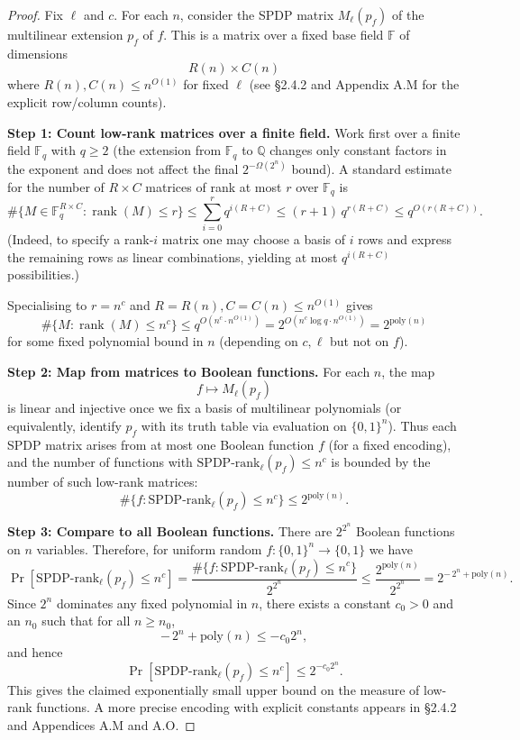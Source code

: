 \documentclass[12pt]{article}
\DeclareMathOperator{\rank}{rank}
\theoremstyle{definition}
\theoremstyle{definition}
\theoremstyle{remark}
\theoremstyle{remark}
\begin{document}
\begin{proof}
Fix $\ell$ and $c$. For each $n$, consider the SPDP matrix $M_\ell(p_f)$ of the multilinear
extension $p_f$ of $f$. This is a matrix over a fixed base field $\mathbb{F}$ of
dimensions
\[
  R(n) \times C(n)
\]
where $R(n), C(n) \le n^{O(1)}$ for fixed $\ell$ (see \S2.4.2 and Appendix A.M for the explicit
row/column counts).

\medskip\noindent
\textbf{Step 1: Count low-rank matrices over a finite field.}
Work first over a finite field $\mathbb{F}_q$ with $q \ge 2$ (the extension from $\mathbb{F}_q$
to $\mathbb{Q}$ changes only constant factors in the exponent and does not affect the final
$2^{-\Omega(2^n)}$ bound). A standard estimate for the number of $R \times C$ matrices of
rank at most $r$ over $\mathbb{F}_q$ is
\[
  \#\{M \in \mathbb{F}_q^{R \times C} : \rank(M) \le r\}
  \le
  \sum_{i=0}^{r} q^{i(R+C)}
  \le (r+1)\, q^{r(R+C)}
  \le q^{O(r(R+C))}.
\]
(Indeed, to specify a rank-$i$ matrix one may choose a basis of $i$ rows and express the
remaining rows as linear combinations, yielding at most $q^{i(R+C)}$ possibilities.)

Specialising to $r = n^c$ and $R = R(n), C = C(n) \le n^{O(1)}$ gives
\[
  \#\{M : \rank(M) \le n^c\}
  \le
  q^{O(n^c \cdot n^{O(1)})}
  =
  2^{O(n^c \log q \cdot n^{O(1)})}
  =
  2^{\mathrm{poly}(n)}
\]
for some fixed polynomial bound in $n$ (depending on $c,\ell$ but not on $f$).

\medskip\noindent
\textbf{Step 2: Map from matrices to Boolean functions.}
For each $n$, the map
\[
  f \longmapsto M_\ell(p_f)
\]
is linear and injective once we fix a basis of multilinear polynomials (or equivalently,
identify $p_f$ with its truth table via evaluation on $\{0,1\}^n$). Thus each SPDP matrix
arises from at most one Boolean function $f$ (for a fixed encoding), and the number of
functions with $\mathrm{SPDP\text{-}rank}_\ell(p_f) \le n^c$ is bounded by the number of such
low-rank matrices:
\[
  \#\{ f : \mathrm{SPDP\text{-}rank}_\ell(p_f) \le n^c \}
  \le
  2^{\mathrm{poly}(n)}.
\]

\medskip\noindent
\textbf{Step 3: Compare to all Boolean functions.}
There are $2^{2^n}$ Boolean functions on $n$ variables. Therefore, for uniform random
$f : \{0,1\}^n \to \{0,1\}$ we have
\[
  \Pr[\mathrm{SPDP\text{-}rank}_\ell(p_f) \le n^c]
  =
  \frac{\#\{ f : \mathrm{SPDP\text{-}rank}_\ell(p_f) \le n^c \}}
       {2^{2^n}}
  \le
  \frac{2^{\mathrm{poly}(n)}}{2^{2^n}}
  =
  2^{-\,2^n + \mathrm{poly}(n)}.
\]
Since $2^n$ dominates any fixed polynomial in $n$, there exists a constant $c_0 > 0$ and
an $n_0$ such that for all $n \ge n_0$,
\[
  -\,2^n + \mathrm{poly}(n) \le -c_0 2^n,
\]
and hence
\[
  \Pr[\mathrm{SPDP\text{-}rank}_\ell(p_f) \le n^c]
  \le 2^{-c_0 2^n}.
\]
This gives the claimed exponentially small upper bound on the measure of low-rank
functions. A more precise encoding with explicit constants appears in \S2.4.2 and Appendices A.M and A.O.
\end{proof}
\end{document}
